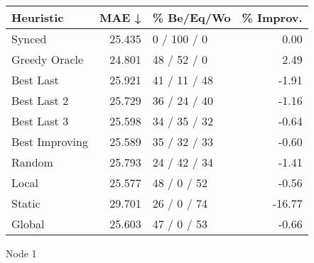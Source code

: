 \begin{tabular}{lrlr}
\toprule
\textbf{Heuristic} & \textbf{MAE ↓} & \textbf{\% Be/Eq/Wo} & \textbf{\% Improv.} \\
\midrule
            Synced &         25.435 &          0 / 100 / 0 &                0.00 \\
     Greedy Oracle &         24.801 &          48 / 52 / 0 &                2.49 \\
         Best Last &         25.921 &         41 / 11 / 48 &               -1.91 \\
       Best Last 2 &         25.729 &         36 / 24 / 40 &               -1.16 \\
       Best Last 3 &         25.598 &         34 / 35 / 32 &               -0.64 \\
    Best Improving &         25.589 &         35 / 32 / 33 &               -0.60 \\
            Random &         25.793 &         24 / 42 / 34 &               -1.41 \\
             Local &         25.577 &          48 / 0 / 52 &               -0.56 \\
            Static &         29.701 &          26 / 0 / 74 &              -16.77 \\
            Global &         25.603 &          47 / 0 / 53 &               -0.66 \\
\bottomrule
\end{tabular}
\caption{Node 1}
\label{tab:iid_lr05_le2_bs2_1}
